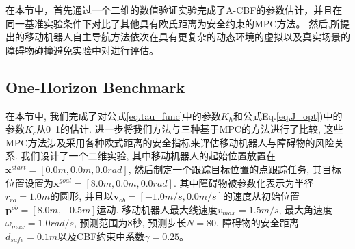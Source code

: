 \documentclass[preprint,5p,times,twocolumn]{elsarticle}
\begin{document}
在本节中，首先通过一个二维的数值验证实验完成了A-CBF的参数估计，并且在同一基准实验条件下对比了其他具有欧氏距离为安全约束的MPC方法。
然后,所提出的移动机器人自主导航方法依次在具有更复杂的动态环境的虚拟以及真实场景的障碍物碰撞避免实验中对进行评估。

\subsection{One-Horizon Benchmark}

在本节中, 我们完成了对公式\ref{eq.tau_func}中的参数$K_h$和公式Eq.\ref{eq.J_opt})中的参数$K_c$从0~1的估计.
进一步将我们方法与三种基于MPC的方法\citep{jian2022dynamicCB,Zeng2020SafetyCriticalMP,Brito2019ModelPC}进行了比较, 这些MPC方法涉及采用各种欧式距离的安全指标来评估移动机器人与障碍物的风险关系. 
我们设计了一个二维实验, 其中移动机器人的起始位置放置在$\boldsymbol{x}^{start}=[0.0m,0.0m,0.0rad]$, 然后制定一个跟踪目标位置的点跟踪任务, 其目标位置设置为$\boldsymbol{x}^{goal}=[8.0m,0.0m,0.0rad]$. 
其中障碍物被参数化表示为半径$r_{ro}=1.0m$的圆形, 并且以$\boldsymbol{v}_{ob}=[-1.0m/s,0.0m/s]$的速度从初始位置$\boldsymbol{p}^{ob}=[8.0m,-0.5m]$运动. 
移动机器人最大线速度$v_{max}=1.5m/s$, 最大角速度$\omega_{max}=1.0rad/s$, 预测范围为8秒, 预测步长$N=80$, 障碍物的安全距离$d_{safe}=0.1m$以及CBF约束中系数$\gamma=0.25$。
\end{document}

